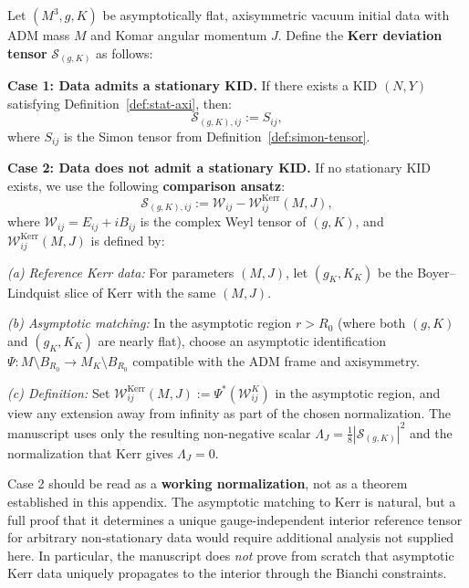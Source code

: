 \begin{definition}\label{def:kerr-deviation-general}
Let $(M^3, g, K)$ be asymptotically flat, axisymmetric vacuum initial data with ADM mass $M$ and Komar angular momentum $J$. Define the \textbf{Kerr deviation tensor} $\mathcal{S}_{(g,K)}$ as follows:

\textbf{Case 1: Data admits a stationary KID.}
If there exists a KID $(N, Y)$ satisfying Definition~\ref{def:stat-axi}, then:
\[
\mathcal{S}_{(g,K),ij} := S_{ij},
\]
where $S_{ij}$ is the Simon tensor from Definition~\ref{def:simon-tensor}.

\textbf{Case 2: Data does not admit a stationary KID.}
If no stationary KID exists, we use the following \textbf{comparison ansatz}:
\begin{equation}\label{eq:kerr-deviation-nonstat}
\mathcal{S}_{(g,K),ij} := \mathcal{W}_{ij} - \mathcal{W}^{\mathrm{Kerr}}_{ij}(M, J),
\end{equation}
where $\mathcal{W}_{ij} = E_{ij} + iB_{ij}$ is the complex Weyl tensor of $(g, K)$, and $\mathcal{W}^{\mathrm{Kerr}}_{ij}(M, J)$ is defined by:

\textit{(a) Reference Kerr data:} For parameters $(M, J)$, let $(g_K, K_K)$ be the Boyer--Lindquist slice of Kerr with the same $(M, J)$.

\textit{(b) Asymptotic matching:} In the asymptotic region $r > R_0$ (where both $(g, K)$ and $(g_K, K_K)$ are nearly flat), choose an asymptotic identification $\Psi: M \setminus B_{R_0} \to M_K \setminus B_{R_0}$ compatible with the ADM frame and axisymmetry.

\textit{(c) Definition:} Set $\mathcal{W}^{\mathrm{Kerr}}_{ij}(M, J) := \Psi^*(\mathcal{W}^K_{ij})$ in the asymptotic region, and view any extension away from infinity as part of the chosen normalization. The manuscript uses only the resulting non-negative scalar $\Lambda_J=\frac18|\mathcal{S}_{(g,K)}|^2$ and the normalization that Kerr gives $\Lambda_J=0$.
\end{definition}

\begin{remark}\label{thm:well-posed-nonstat}
Case 2 should be read as a \textbf{working normalization}, not as a theorem established in this appendix. The asymptotic matching to Kerr is natural, but a full proof that it determines a unique gauge-independent interior reference tensor for arbitrary non-stationary data would require additional analysis not supplied here. In particular, the manuscript does \emph{not} prove from scratch that asymptotic Kerr data uniquely propagates to the interior through the Bianchi constraints.
\end{remark}

